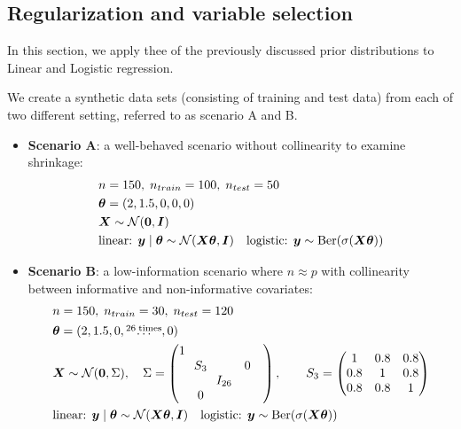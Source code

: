 \subsection{Regularization and variable selection}

In this section, we apply thee of the previously discussed prior distributions to Linear and Logistic regression.

We create a synthetic data sets (consisting of training and test data) from each of two different setting, referred to as scenario A and B.

\begin{itemize}
    \item \textbf{Scenario A}: a well-behaved scenario without collinearity to examine shrinkage:
    \begin{equation*}
        \begin{aligned}
            &n = 150,\; n_{train} = 100,\;n_{test} = 50 \\
            &\bm{\theta} = (2, 1.5, 0, 0, 0) \\
            &\bm{X} \sim \mathcal{N}(\bm{0}, \bm{I}) \\
            &\text{linear: } \bm{y} \mid \bm{\theta} \sim \mathcal{N}(\bm{X} \bm{\theta},\bm{I})\quad \text{logistic: } \bm{y} \sim \text{Ber}(\sigma(\bm{X} \bm{\theta}))
        \end{aligned}
    \end{equation*}
    \item \textbf{Scenario B}: a low-information scenario where $n \approx p$ with collinearity between informative and non-informative covariates:
    \begin{equation*}
        \begin{aligned}
            &n = 150,\; n_{train} = 30,\;n_{test} = 120 \\
            &\bm{\theta} = (2, 1.5, 0, \overset{26\; \text{times}}{\dots}, 0) \\
            &\bm{X} \sim \mathcal{N}(\bm{0}, \Sigma), \quad \Sigma =
                    \begin{pmatrix}
                    1 &        &         &        &        \\
                        & \!\!S_3\!\! &        & 0      &        \\
                        &        & I_{26} &        &        \\
                        & 0      &        &        &        \\
                    \end{pmatrix},
                    \qquad
                    S_3 = 
                    \begin{pmatrix}
                    1   & 0.8 & 0.8\\
                    0.8 & 1   & 0.8\\
                    0.8 & 0.8 & 1
                    \end{pmatrix}\\
            &\text{linear: } \bm{y} \mid \bm{\theta} \sim \mathcal{N}(\bm{X} \bm{\theta}, \bm{I})\quad \text{logistic: } \bm{y} \sim \text{Ber}(\sigma(\bm{X} \bm{\theta}))
        \end{aligned}
    \end{equation*}
\end{itemize}

